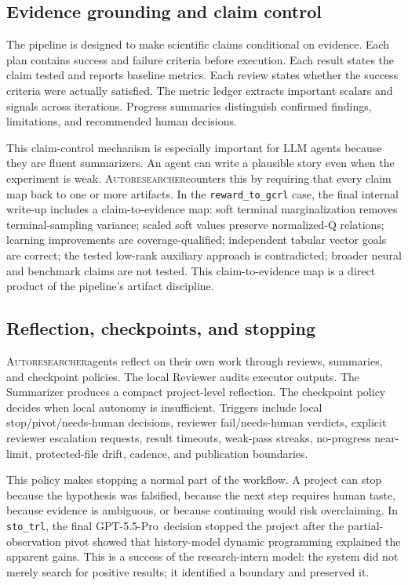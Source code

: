 \documentclass{article}
\newcommand{\sys}{\textsc{Autoresearcher}}
\newcommand{\gptpro}{GPT-5.5-Pro}
\begin{document}
\subsection{Evidence grounding and claim control}

The pipeline is designed to make scientific claims conditional on evidence. Each plan contains success and failure criteria before execution. Each result states the claim tested and reports baseline metrics. Each review states whether the success criteria were actually satisfied. The metric ledger extracts important scalars and signals across iterations. Progress summaries distinguish confirmed findings, limitations, and recommended human decisions.

This claim-control mechanism is especially important for LLM agents because they are fluent summarizers. An agent can write a plausible story even when the experiment is weak. \sys counters this by requiring that every claim map back to one or more artifacts. In the \texttt{reward\_to\_gcrl} case, the final internal write-up includes a claim-to-evidence map: soft terminal marginalization removes terminal-sampling variance; scaled soft values preserve normalized-Q relations; learning improvements are coverage-qualified; independent tabular vector goals are correct; the tested low-rank auxiliary approach is contradicted; broader neural and benchmark claims are not tested. This claim-to-evidence map is a direct product of the pipeline's artifact discipline.

\subsection{Reflection, checkpoints, and stopping}

\sys agents reflect on their own work through reviews, summaries, and checkpoint policies. The local Reviewer audits executor outputs. The Summarizer produces a compact project-level reflection. The checkpoint policy decides when local autonomy is insufficient. Triggers include local stop/pivot/needs-human decisions, reviewer fail/needs-human verdicts, explicit reviewer escalation requests, result timeouts, weak-pass streaks, no-progress near-limit, protected-file drift, cadence, and publication boundaries.

This policy makes stopping a normal part of the workflow. A project can stop because the hypothesis was falsified, because the next step requires human taste, because evidence is ambiguous, or because continuing would risk overclaiming. In \texttt{sto\_trl}, the final \gptpro\ decision stopped the project after the partial-observation pivot showed that history-model dynamic programming explained the apparent gains. This is a success of the research-intern model: the system did not merely search for positive results; it identified a boundary and preserved it.
\end{document}
